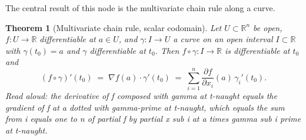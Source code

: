 \documentclass[11pt]{article}
\newtheorem{theorem}{Theorem}
\theoremstyle{definition}
\theoremstyle{remark}
\newcommand{\R}{\mathbb{R}}
\newcommand{\grad}{\nabla}
\begin{document}
The central result of this node is the multivariate chain rule along a curve.

\begin{theorem}[Multivariate chain rule, scalar codomain]\label{thm:chain}
Let $U \subset \R^n$ be open, $f : U \to \R$ differentiable at $a \in U$, and $\gamma : I \to U$ a curve on an open interval $I \subset \R$ with $\gamma(t_0) = a$ and $\gamma$ differentiable at $t_0$. Then $f \circ \gamma : I \to \R$ is differentiable at $t_0$ and
\[
(f \circ \gamma)'(t_0) \;=\; \grad f(a) \cdot \gamma'(t_0) \;=\; \sum_{i=1}^{n} \frac{\partial f}{\partial x_i}(a) \, \gamma_i'(t_0).
\]
\emph{Read aloud:} the derivative of f composed with gamma at t-naught equals the gradient of f at a dotted with gamma-prime at t-naught, which equals the sum from i equals one to n of partial f by partial x sub i at a times gamma sub i prime at t-naught.
\end{theorem}
\end{document}
